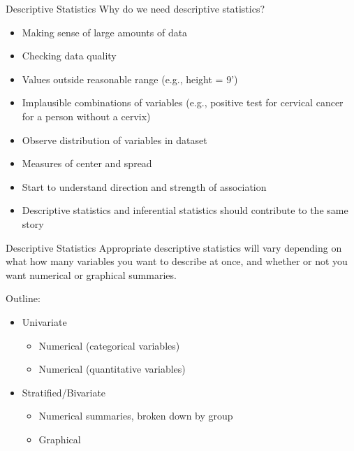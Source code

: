 \documentclass[
  ignorenonframetext,
]{beamer}
\providecommand{\tightlist}{%
  \setlength{\itemsep}{0pt}\setlength{\parskip}{0pt}}
\begin{document}
\begin{frame}{Descriptive Statistics}
\protect\hypertarget{descriptive-statistics}{}
Why do we need descriptive statistics?

\begin{itemize}
\item
  Making sense of large amounts of data
\item
  Checking data quality
\item
  Values outside reasonable range (e.g., height = 9')
\item
  Implausible combinations of variables (e.g., positive test for
  cervical cancer for a person without a cervix)
\item
  Observe distribution of variables in dataset
\item
  Measures of center and spread
\item
  Start to understand direction and strength of association
\item
  Descriptive statistics and inferential statistics should contribute to
  the same story
\end{itemize}
\end{frame}

\begin{frame}{Descriptive Statistics}
\protect\hypertarget{descriptive-statistics-1}{}
Appropriate descriptive statistics will vary depending on what how many
variables you want to describe at once, and whether or not you want
numerical or graphical summaries.

Outline:

\begin{itemize}
\item
  Univariate

  \begin{itemize}
  \tightlist
  \item
    Numerical (categorical variables)
  \item
    Numerical (quantitative variables)
  \end{itemize}
\item
  Stratified/Bivariate

  \begin{itemize}
  \tightlist
  \item
    Numerical summaries, broken down by group
  \item
    Graphical
  \end{itemize}
\end{itemize}
\end{frame}
\end{document}
